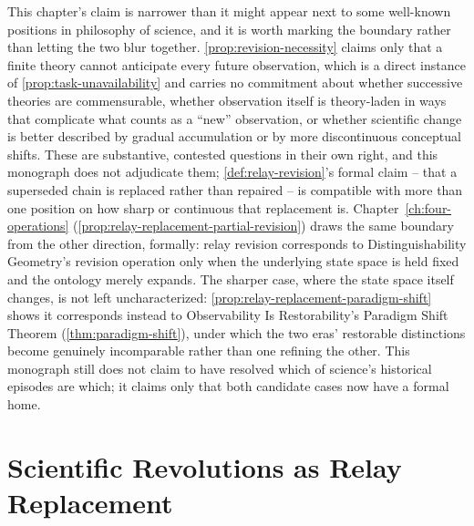 This chapter's claim is narrower than it might appear next to some
well-known positions in philosophy of science, and it is worth marking
the boundary rather than letting the two blur together.
\cref{prop:revision-necessity} claims only that a finite theory cannot
anticipate every future observation, which is a direct instance of
\cref{prop:task-unavailability} and carries no commitment about whether
successive theories are commensurable, whether observation itself is
theory-laden in ways that complicate what counts as a ``new''
observation, or whether scientific change is better described by gradual
accumulation or by more discontinuous conceptual shifts. These are
substantive, contested questions in their own right, and this monograph
does not adjudicate them; \cref{def:relay-revision}'s formal claim --
that a superseded chain is replaced rather than repaired -- is compatible
with more than one position on how sharp or continuous that replacement
is. Chapter~\ref{ch:four-operations}
(\cref{prop:relay-replacement-partial-revision}) draws the same boundary
from the other direction, formally: relay revision corresponds to
Distinguishability Geometry's revision operation only when the underlying
state space is held fixed and the ontology merely expands. The sharper
case, where the state space itself changes, is not left uncharacterized:
\cref{prop:relay-replacement-paradigm-shift} shows it corresponds instead
to Observability Is Restorability's Paradigm Shift Theorem
(\cref{thm:paradigm-shift}), under which the two eras' restorable
distinctions become genuinely incomparable rather than one refining the
other. This monograph still does not claim to have resolved which of
science's historical episodes are which; it claims only that both
candidate cases now have a formal home.

\section{Scientific Revolutions as Relay Replacement}

